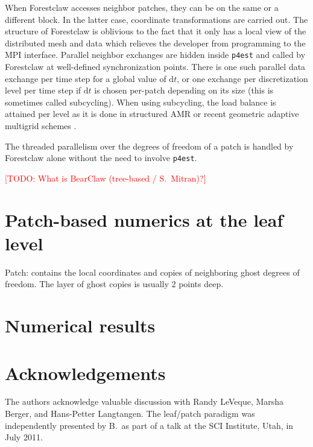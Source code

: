\documentclass{IOS-Book-Article}     %
\newcommand{\todo}[1]{\textcolor{red}{[TODO: #1]}\xspace}
\newcommand{\dt}{\mathrm{d}t}
\newcommand{\forestclaw}{Forestclaw\xspace}
\newcommand{\pforest}{\texttt{p4est}\xspace}
\begin{document}
When \forestclaw accesses neighbor patches, they can be on the same or a
different block.  In the latter case, coordinate transformations are carried
out.  The structure of \forestclaw is oblivious to the fact that it only has a
local view of the distributed mesh and data which relieves the developer from
programming to the MPI interface.  Parallel neighbor exchanges are hidden
inside \pforest and called by \forestclaw at well-defined synchronization
points.  There is one such parallel data exchange per time step for a global
value of $\dt$, or one exchange per discretization level per time step if $\dt$
is chosen per-patch depending on its size (this is sometimes called
subcycling).  When using subcycling, the load balance is attained per level as
it is done in structured AMR or recent geometric adaptive multigrid schemes
\cite{SundarBirosBursteddeEtAl12}.

The threaded parallelism over the degrees of freedom of a patch is handled by
\forestclaw alone without the need to involve \pforest.





\todo{What is BearClaw (tree-based / S.\ Mitran)?}

\section{Patch-based numerics at the leaf level}


Patch: contains the local coordinates and copies of neighboring ghost degrees
of freedom.  The layer of ghost copies is usually 2 points deep.


\section{Numerical results}



\section*{Acknowledgements}

The authors acknowledge valuable discussion with Randy LeVeque, Marsha Berger,
and Hans-Petter Langtangen.  The leaf/patch paradigm was independently presented
by B.\ as part of a talk at the SCI Institute, Utah, in July 2011.




\end{document}
